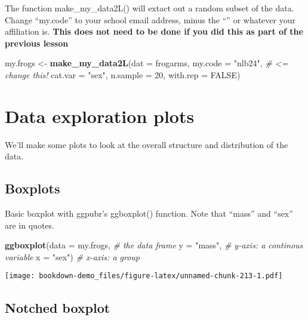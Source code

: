 \documentclass[]{book}
\newenvironment{Shaded}{\begin{snugshade}}{\end{snugshade}}
\newcommand{\KeywordTok}[1]{\textcolor[rgb]{0.13,0.29,0.53}{\textbf{#1}}}
\newcommand{\DataTypeTok}[1]{\textcolor[rgb]{0.13,0.29,0.53}{#1}}
\newcommand{\DecValTok}[1]{\textcolor[rgb]{0.00,0.00,0.81}{#1}}
\newcommand{\StringTok}[1]{\textcolor[rgb]{0.31,0.60,0.02}{#1}}
\newcommand{\CommentTok}[1]{\textcolor[rgb]{0.56,0.35,0.01}{\textit{#1}}}
\newcommand{\OtherTok}[1]{\textcolor[rgb]{0.56,0.35,0.01}{#1}}
\newcommand{\NormalTok}[1]{#1}
\theoremstyle{definition}
\theoremstyle{definition}
\theoremstyle{definition}
\theoremstyle{remark}
\begin{document}
The function make\_my\_data2L() will extact out a random subset of the
data. Change ``my.code'' to your school email address, minus the
``\citet{pitt.edu}'' or whatever your affiliation is. \textbf{This does
not need to be done if you did this as part of the previous lesson}

\begin{Shaded}
\begin{Highlighting}[]
\NormalTok{my.frogs <-}\StringTok{ }\KeywordTok{make_my_data2L}\NormalTok{(}\DataTypeTok{dat =}\NormalTok{ frogarms, }
                           \DataTypeTok{my.code =} \StringTok{"nlb24"}\NormalTok{, }\CommentTok{# <=  change this!}
                           \DataTypeTok{cat.var =} \StringTok{"sex"}\NormalTok{,}
                           \DataTypeTok{n.sample =} \DecValTok{20}\NormalTok{, }
                           \DataTypeTok{with.rep =} \OtherTok{FALSE}\NormalTok{)}
\end{Highlighting}
\end{Shaded}

\section{Data exploration plots}\label{data-exploration-plots}

We'll make some plots to look at the overall structure and distribution
of the data.

\subsection{Boxplots}\label{boxplots}

Basic boxplot with ggpubr's ggboxplot() function. Note that ``mass'' and
``sex'' are in quotes.

\begin{Shaded}
\begin{Highlighting}[]
\KeywordTok{ggboxplot}\NormalTok{(}\DataTypeTok{data =}\NormalTok{ my.frogs, }\CommentTok{# the data frame}
          \DataTypeTok{y =} \StringTok{"mass"}\NormalTok{,      }\CommentTok{# y-axis: a continous variable}
          \DataTypeTok{x =} \StringTok{"sex"}\NormalTok{)       }\CommentTok{# x-axis: a group}
\end{Highlighting}
\end{Shaded}

\texttt{[image: bookdown-demo\_files/figure-latex/unnamed-chunk-213-1.pdf]}

\subsection{Notched boxplot}\label{notched-boxplot}
\end{document}
